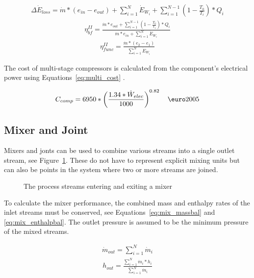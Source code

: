         \begin{align}
            \Delta\Dot{E}_{loss} = \Dot{m} * (e_{in} - e_{out}) + \sum_{i=1}^N \Dot{E}_{W_i} + \sum_{i=1}^{N-1} \left( 1 - \frac{T_0}{T_i} \right)*Q_i\label{eq:multi_exloss}
        \end{align}
        \begin{align}
            \eta_{bf}^{II}= \frac{\Dot{m} * e_{out} + \sum_{i=1}^{N-1} \left( 1 - \frac{T_0}{T_i} \right)*Q_i}{\Dot{m} * e_{in} + \sum_{i=1}^N \Dot{E}_{W_i}} \label{eq:multi_exBF}
        \end{align}
        \begin{align}
            \eta_{func}^{II}= \frac{\Dot{m}*(e_2 - e_1)}{\sum_{i=1}^N \Dot{E}_{W_i}} \label{eq:multi_exFUNC}
        \end{align}

        The cost of multi-stage compressors is calculated from the component's electrical power using Equations~\ref{eq:multi_cost} \cite{Duc2007}.

        \begin{align}
            C_{comp}= 6950*\left(\frac{1.34*\Dot{W}_{elec}}{1000}\right)^{0.82} \quad  \textup{\euro}2005 \label{eq:multi_cost}
        \end{align}
        
    \subsection{Mixer and Joint}
        Mixers and jonts can be used to combine various streams into a single outlet stream, see Figure~\ref{fig:mixer}. These do not have to represent explicit mixing units but can also be points in the system where two or more streams are joined.

        \begin{figure}[H]
            \centering
                        
            \caption{The process streams entering and exiting a mixer}
            \label{fig:mixer}
        \end{figure}

        To calculate the mixer performance, the combined mass and enthalpy rates of the inlet streams must be conserved, see Equations~\eqref{eq:mix_massbal} and \eqref{eq:mix_enthalpbal}. The outlet pressure is assumed to be the minimum pressure of the mixed streams.

        \begin{align} 
            \Dot{m}_{out} = \sum_{i=1}^{N}\Dot{m}_{i} \label{eq:mix_massbal}
        \end{align}
        \begin{align}
            h_{out} = \frac{\sum_{i=1}^{N}\Dot{m}_{i} * h_{i}}{\sum_{i=1}^{N}\Dot{m}_{i}} \label{eq:mix_enthalpbal}
        \end{align}    


